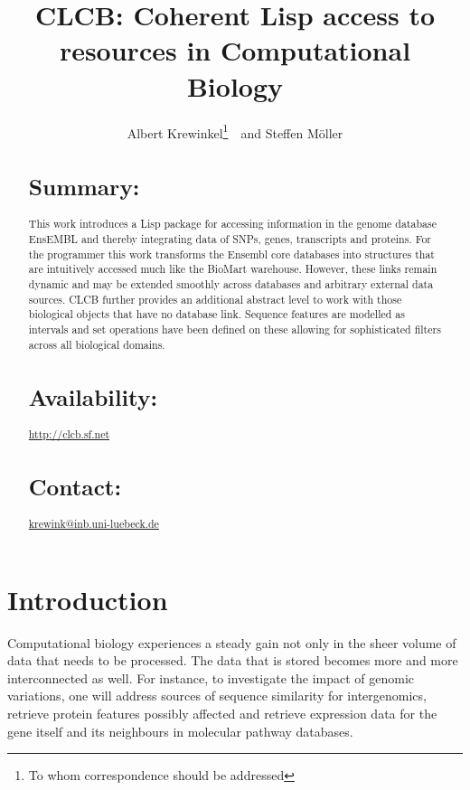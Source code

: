 \documentclass{bioinfo}
\begin{document}

\title[CLCB: Lisp for Computational Biology]{CLCB: Coherent Lisp access to resources in Computational Biology}
\author[A. Krewinkel and S. M{\"{o}}ller]{Albert Krewinkel\footnote{To whom correspondence should
        be addressed}\ \   and Steffen M{\"{o}}ller}
\address{University of L{\"{u}}beck, Institute for Neuro- and Bioinformatics, 23538 L\"ubeck, Germany}

\maketitle

\begin{abstract}
\section{Summary:}
This work introduces a Lisp package for accessing information in the
genome database EnsEMBL and thereby integrating data of SNPs, genes,
transcripts and proteins. 
%
For the programmer this work transforms the Ensembl core databases
into structures that are intuitively accessed much like the BioMart
warehouse. However, these links remain dynamic and may be extended
smoothly across databases and arbitrary external data sources.
%
CLCB further provides an additional abstract level to work with those
biological objects that have no database link. Sequence features are
modelled as intervals and set operations have been defined on these
allowing for sophisticated filters across all biological domains.

\section{Availability:} \href{http://clcb.sf.net}{http://clcb.sf.net}
\section{Contact:} \href{krewink@inb.uni-luebeck.de}{krewink@inb.uni-luebeck.de}

\end{abstract}

\section{Introduction}

Computational biology experiences a steady gain not only in the sheer
volume of data that needs to be processed. The data that is stored
becomes more and more interconnected as well. For instance, to investigate
the impact of genomic variations, one will address sources of sequence
similarity for intergenomics, retrieve protein features possibly affected
and retrieve expression data for the gene itself and its neighbours in
molecular pathway  databases.
\end{document}
